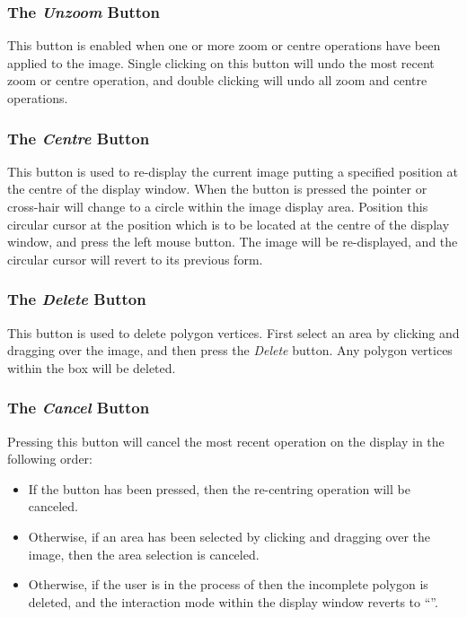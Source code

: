 \subsubsection {The {\em Unzoom} Button}
This button is enabled when one or more zoom or centre operations have 
been applied to the image. Single clicking on this button will undo the
most recent zoom or centre operation, and double clicking will undo
all zoom and centre operations.

\subsubsection {The {\em Centre} Button}
This button is used to re-display the current image putting a specified
position at the centre of the display window. When the button is pressed 
the pointer or cross-hair will change to a circle within the image display 
area. Position this circular cursor at the position which is to be
located at the centre of the display window, and press the left mouse
button. The image will be re-displayed, and the circular cursor will
revert to its previous form.

\subsubsection {The {\em Delete} Button}
This button is used to delete polygon vertices. First
select an area by clicking and dragging over the image, and then press
the {\em Delete} button. Any polygon vertices within the box will be deleted.

\subsubsection {The {\em Cancel} Button}
Pressing this button will cancel the most recent operation on the display
in the following order:

\begin{itemize}
\item If the  button has been
pressed, then the re-centring operation will be canceled.

\item Otherwise, if an area has been selected by clicking and dragging
over the image, then the area selection is canceled.

\item Otherwise, if the user is in the process of 
 then the incomplete
polygon is deleted, and the interaction mode within the display window
reverts to ``''.
\end{itemize}

